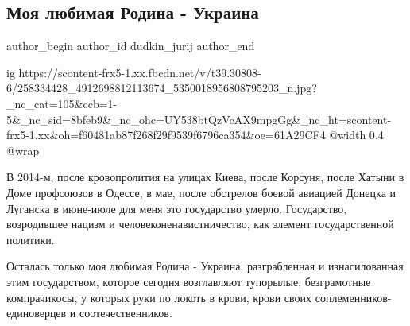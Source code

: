  
 
 
 
 
 
\subsection{Моя любимая Родина - Украина}
\label{sec:21_11_2021.fb.dudkin_jurij.1.rodina_ukraina}
 
\ifcmt
 author_begin
   author_id dudkin_jurij
 author_end
\fi

\ifcmt
  ig https://scontent-frx5-1.xx.fbcdn.net/v/t39.30808-6/258334428_4912698812113674_5350018956808795203_n.jpg?_nc_cat=105&ccb=1-5&_nc_sid=8bfeb9&_nc_ohc=UY538btQzVcAX9mpgGg&_nc_ht=scontent-frx5-1.xx&oh=f60481ab87f268f29f9539f6796ca354&oe=61A29CF4
  @width 0.4
  @wrap 
\fi

В 2014-м, после кровопролития на улицах Киева, после Корсуня, после Хатыни в
Доме профсоюзов в Одессе, в мае,  после обстрелов боевой авиацией Донецка и
Луганска в июне-июле для меня это государство умерло. Государство, возродившее
нацизм и человеконенавистничество, как элемент государственной политики.

Осталась только моя любимая Родина - Украина, разграбленная и изнасилованная
этим государством, которое сегодня возглавляют тупорылые, безграмотные
компрачикосы, у которых руки по локоть в крови, крови своих
соплеменников-единоверцев и соотечественников.


